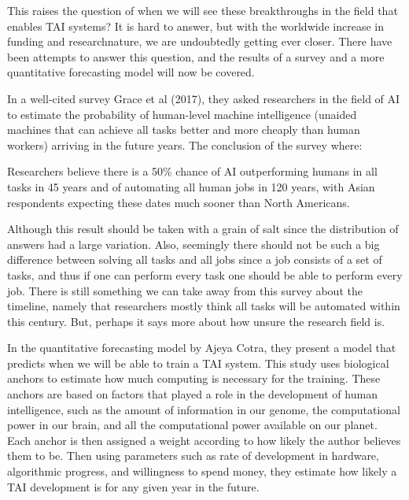 \documentclass[12pt,A4]{report}
\newcommand{\autobaj}{}
\theoremstyle{definition}
\begin{document}
This raises the question of when we will see these breakthroughs in the field that enables TAI systems? It is hard to answer, but with the worldwide increase in funding and research\autobaj{nature}, we are undoubtedly getting ever closer. There have been attempts to answer this question, and the results of a survey and a more quantitative forecasting model will now be covered. 

In a well-cited survey \autobaj{Grace et al} (2017), they asked researchers in the field of AI to estimate the probability of human-level machine intelligence (unaided machines that can achieve all tasks better and more cheaply than human workers) arriving in the future years. The conclusion of the survey where:
\begin{displayquote}
Researchers believe there is a 50\% chance of AI outperforming humans in all tasks in 45 years and of automating all human jobs in 120 years, with Asian respondents expecting these dates much sooner than North Americans.
\end{displayquote}
Although this result should be taken with a grain of salt since the distribution of answers had a large variation. Also, seemingly there should not be such a big difference between solving all tasks and all jobs since a job consists of a set of tasks, and thus if one can perform every task one should be able to perform every job. There is still something we can take away from this survey about the timeline, namely that researchers mostly think all tasks will be automated within this century. But, perhaps it says more about how unsure the research field is. 

In the quantitative forecasting model by \autobaj{Ajeya Cotra}, they present a model that predicts when we will be able to train a TAI system. This study uses biological anchors to estimate how much computing is necessary for the training. These anchors are based on factors that played a role in the development of human intelligence, such as the amount of information in our genome, the computational power in our brain, and all the computational power available on our planet. Each anchor is then assigned a weight according to how likely the author believes them to be. Then using parameters such as rate of development in hardware, algorithmic progress, and willingness to spend money, they estimate how likely a TAI development is for any given year in the future. 
\end{document}
